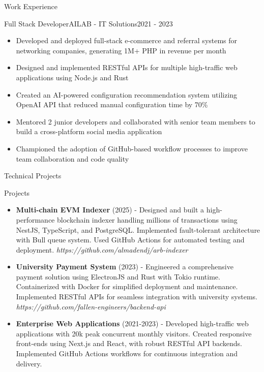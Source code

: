 \documentclass[]{mcdowellcv}
\begin{document}
\begin{cvsection}{Work Experience}
		\begin{cvsubsection}{Full Stack Developer}{AILAB - IT Solutions}{2021 - 2023}
			\begin{itemize}
				\item Developed and deployed full-stack e-commerce and referral systems for networking companies, generating 1M+ PHP in revenue per month
				\item Designed and implemented RESTful APIs for multiple high-traffic web applications using Node.js and Rust
				\item Created an AI-powered configuration recommendation system utilizing OpenAI API that reduced manual configuration time by 70\%
        \item Mentored 2 junior developers and collaborated with senior team members to build a cross-platform social media application
        \item Championed the adoption of GitHub-based workflow processes to improve team collaboration and code quality
			\end{itemize}
		\end{cvsubsection}
	\end{cvsection}

	\begin{cvsection}{Technical Projects}
		\begin{cvsubsection}{Projects}{}{}
			\begin{itemize}
				\item \textbf{Multi-chain EVM Indexer} (2025) - Designed and built a high-performance blockchain indexer handling millions of transactions using NestJS, TypeScript, and PostgreSQL. Implemented fault-tolerant architecture with Bull queue system. Used GitHub Actions for automated testing and deployment. \textit{https://github.com/almadendj/arb-indexer}
				\item \textbf{University Payment System} (2023) - Engineered a comprehensive payment solution using ElectronJS and Rust with Tokio runtime. Containerized with Docker for simplified deployment and maintenance. Implemented RESTful APIs for seamless integration with university systems. \textit{https://github.com/fallen-engineers/backend-api}
				\item \textbf{Enterprise Web Applications} (2021-2023) - Developed high-traffic web applications with 20k peak concurrent monthly visitors. Created responsive front-ends using Next.js and React, with robust RESTful API backends. Implemented GitHub Actions workflows for continuous integration and delivery.
			\end{itemize}
		\end{cvsubsection}
	\end{cvsection}
	
\end{document}
